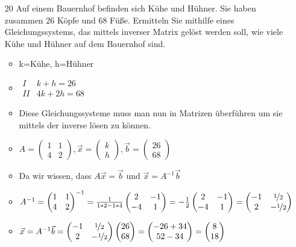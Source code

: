 \documentclass{article}
\begin{document}
\begin{itemize}
\begin{itemize}
		\end{itemize}
		\item[20]{Auf einem Bauernhof befinden sich Kühe und Hühner. Sie haben zusammen 26 Köpfe und 68 Füße. Ermitteln Sie mithilfe eines Gleichungssystems, das mittels inverser Matrix gelöst werden soll, wie viele Kühe und Hühner auf dem Bauernhof sind.}
		\begin{itemize}
			\item{k=Kühe, h=Hühner}
			\item{$\begin{matrix} I & k+h=26 \\ II & 4k+2h=68 \end{matrix}$}
			\item{Diese Gleichungssysteme muss man nun in Matrizen überführen um sie mittels der inverse lösen zu können.}
			\item{$A=\begin{pmatrix} 1 & 1 \\ 4 & 2 \end{pmatrix}, \vec{x}=\begin{pmatrix} k \\ h \end{pmatrix}, \vec{b}=\begin{pmatrix} 26 \\ 68 \end{pmatrix}$}
			\item{Da wir wissen, dass $A \vec{x}=\vec{b}$ und $\vec{x}=A^{-1}\vec{b}$}
			\item{$A^{-1}=\begin{pmatrix} 1 & 1 \\ 4 & 2 \end{pmatrix}^{-1}=\frac{1}{1*2-1*4}\begin{pmatrix} 2 & -1 \\ -4 & 1 \end{pmatrix}=-\frac{1}{2}\begin{pmatrix} 2 & -1 \\ -4 & 1 \end{pmatrix}=\begin{pmatrix} -1 & \nicefrac{1}{2} \\ 2 & -\nicefrac{1}{2} \end{pmatrix}$}
			\item{$\vec{x}=A^{-1}\vec{b}=\begin{pmatrix} -1 & \nicefrac{1}{2} \\ 2 & -\nicefrac{1}{2} \end{pmatrix}\begin{pmatrix} 26 \\ 68 \end{pmatrix}=\begin{pmatrix} -26+34 \\ 52-34 \end{pmatrix}=\begin{pmatrix} 8 \\ 18 \end{pmatrix}$}

\end{itemize}
\end{itemize}
\end{document}
